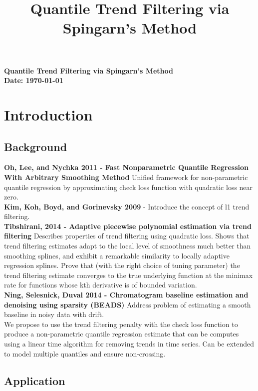 \documentclass{article}
\begin{document}
\title{Quantile Trend Filtering via Spingarn's Method}
\noindent
\textbf{Quantile Trend Filtering via Spingarn's Method}\\
\textbf{Date: \today}\\

\section{Introduction}

\subsection{Background}

\textbf{Oh, Lee, and Nychka 2011 - Fast Nonparametric Quantile Regression With Arbitrary Smoothing Method} Unified framework for non-parametric quantile regression by approximating check loss function with quadratic loss near zero.\\
\textbf{Kim, Koh, Boyd, and Gorinevsky 2009} - Introduce the concept of l1 trend filtering.\\
\textbf{Tibshirani, 2014 - Adaptive piecewise polynomial estimation via trend filtering} Describes properties of trend filtering using quadratic loss. Shows that trend filtering estimates adapt to the local level of smoothness much better than smoothing splines, and exhibit
a remarkable similarity to locally adaptive regression splines. Prove that (with the right choice of tuning parameter) the trend filtering estimate
converges to the true underlying function at the minimax rate for functions whose kth derivative is of bounded variation.\\
\textbf{Ning, Selesnick, Duval 2014 - Chromatogram baseline estimation and denoising using sparsity (BEADS)} Address problem of estimating a smooth baseline in noisy data with drift. \\
We propose to use the trend filtering penalty with the check loss function to produce a non-parametric quantile regression estimate that can be computes using a linear time algorithm for removing trends in time series. Can be extended to model multiple quantiles and ensure non-crossing. 

\subsection{Application}
\end{document}
